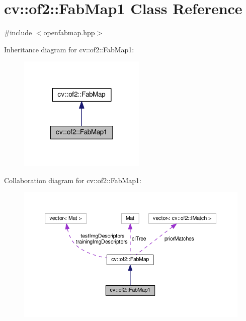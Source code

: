 \hypertarget{classcv_1_1of2_1_1FabMap1}{\section{cv\-:\-:of2\-:\-:Fab\-Map1 Class Reference}
\label{classcv_1_1of2_1_1FabMap1}
}


{\ttfamily \#include $<$openfabmap.\-hpp$>$}



Inheritance diagram for cv\-:\-:of2\-:\-:Fab\-Map1\-:\nopagebreak
\begin{figure}[H]
\begin{center}
\leavevmode
\includegraphics[width=172pt]{classcv_1_1of2_1_1FabMap1__inherit__graph}
\end{center}
\end{figure}


Collaboration diagram for cv\-:\-:of2\-:\-:Fab\-Map1\-:\nopagebreak
\begin{figure}[H]
\begin{center}
\leavevmode
\includegraphics[width=350pt]{classcv_1_1of2_1_1FabMap1__coll__graph}
\end{center}
\end{figure}
